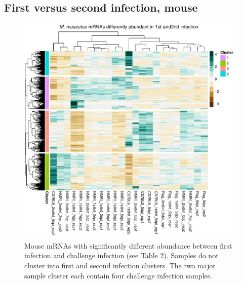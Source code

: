 \documentclass{article}
\begin{document}
\subsection{First versus second infection, mouse}
\begin{figure}[h!]
\includegraphics[width=\linewidth]{Mm1st2ndHeatmap.pdf}  
	\caption{Mouse mRNAs with significantly different abundance between first infection and challenge infection (see Table 2). Samples do not cluster into first and second infection clusters. The two major sample cluster each contain four challenge infection samples.}
\end{figure}
\end{document}
